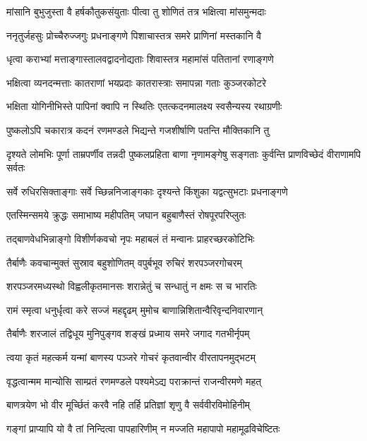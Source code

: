 \twolineshloka
{मांसानि बुभुजुस्ता वै हर्षकौतुकसंयुताः}
{पीत्वा तु शोणितं तत्र भक्षित्वा मांसमुन्मदाः}%

\twolineshloka
{ननृतुर्जहसुः प्रोच्चैरुज्जगुः प्रधनाङ्गणे}
{पिशाचास्तत्र समरे प्राणिनां मस्तकानि वै}%

\twolineshloka
{धृत्वा कराभ्यां मत्ताङ्गास्तालवद्वादनोद्यताः}
{शिवास्तत्र महामांसं पतितानां रणाङ्गणे}%

\twolineshloka
{भक्षित्वा व्यनदन्मत्ताः कातराणां भयप्रदाः}
{कातरास्त्राः समापन्ना गताः कुञ्जरकोटरे}%

\twolineshloka
{भक्षिता योगिनीभिस्ते पापिनां क्वापि न स्थितिः}
{एतत्कदनमालक्ष्य स्वसैन्यस्य रथाग्रणीः}%

\twolineshloka
{पुष्कलोऽपि चकारात्र कदनं रणमण्डले}
{भिद्यन्ते गजशीर्षाणि पतन्ति मौक्तिकानि तु}%


\threelineshloka
{दृश्यते लोमभिः पूर्णा ताम्रपर्णीव तन्नदी}
{पुष्कलप्रहिता बाणा नृणामङ्गेषु सङ्गताः}
{कुर्वन्ति प्राणविच्छेदं वीराणामपि सर्वतः}%

\twolineshloka
{सर्वे रुधिरसिक्ताङ्गाः सर्वे च्छिन्ननिजाङ्गकाः}
{दृश्यन्ते किंशुका यद्वत्सुभटाः प्रधनाङ्गणे}%

\twolineshloka
{एतस्मिन्समये क्रुद्धः समाभाष्य महीपतिम्}
{जघान बहुबाणैस्तं रोषपूरपरिप्लुतः}%

\twolineshloka
{तद्बाणवेधभिन्नाङ्गो विशीर्णकवचो नृपः}
{महाबलं तं मन्वानः प्राहरच्छरकोटिभिः}%

\twolineshloka
{तैर्बाणैः कवचान्मुक्तं सुस्राव बहुशोणितम्}
{वपुर्बभूव रुचिरं शरपञ्जरगोचरम्}%

\twolineshloka
{शरपञ्जरमध्यस्थो विह्वलीकृतमानसः}
{शरान्नेतुं च सन्धातुं न क्षमः स च भारतिः}%

\twolineshloka
{रामं स्मृत्वा धनुर्धृत्वा करे सज्जं महद्दृढम्}
{मुमोच बाणान्निशितान्वैरिवृन्दनिवारणान्}%

\twolineshloka
{तैर्बाणैः शरजालं तद्विधूय मुनिपुङ्गव}
{शङ्खं प्रध्माय समरे जगाद गतभीर्नृपम्}%


\twolineshloka
{त्वया कृतं महत्कर्म यन्मां बाणस्य पञ्जरे}
{गोचरं कृतवान्वीर वीरतापनमुद्भटम्}%

\twolineshloka
{वृद्धत्वान्मम मान्योसि साम्प्रतं रणमण्डले}
{पश्यमेऽद्य पराक्रान्तं राजन्वीरमणे महत्}%

\twolineshloka
{बाणत्रयेण भो वीर मूर्च्छितं करवै नहि}
{तर्हि प्रतिज्ञां शृणु वै सर्ववीरविमोहिनीम्}%

\twolineshloka
{गङ्गां प्राप्यापि यो वै तां निन्दित्वा पापहारिणीम्}
{न मज्जति महापापो महामूढविचेष्टितः}%

